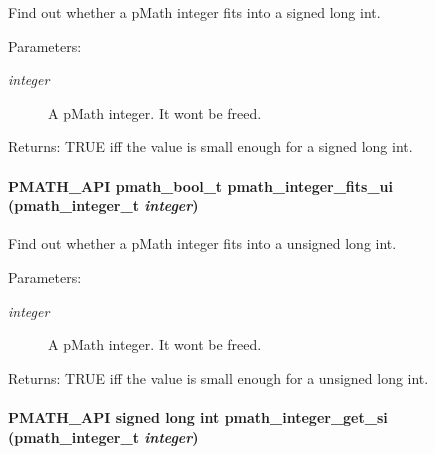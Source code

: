 Find out whether a pMath integer fits into a signed long int. 

\begin{Desc}
\item[Parameters:]
\begin{description}
\item[{\em integer}]A pMath integer. It wont be freed. \end{description}
\end{Desc}
\begin{Desc}
\item[Returns:]TRUE iff the value is small enough for a signed long int. \end{Desc}
\hypertarget{group__numbers_gb12e5e34b7918cb6beee23c57cdd0d36}{
\paragraph[{pmath\_\-integer\_\-fits\_\-ui}]{\setlength{\rightskip}{0pt plus 5cm}PMATH\_\-API {\bf pmath\_\-bool\_\-t} pmath\_\-integer\_\-fits\_\-ui ({\bf pmath\_\-integer\_\-t} {\em integer})}\hfill}
\label{group__numbers_gb12e5e34b7918cb6beee23c57cdd0d36}


Find out whether a pMath integer fits into a unsigned long int. 

\begin{Desc}
\item[Parameters:]
\begin{description}
\item[{\em integer}]A pMath integer. It wont be freed. \end{description}
\end{Desc}
\begin{Desc}
\item[Returns:]TRUE iff the value is small enough for a unsigned long int. \end{Desc}
\hypertarget{group__numbers_g12219f6f678ed0ddff66d352e0dabbd1}{
\paragraph[{pmath\_\-integer\_\-get\_\-si}]{\setlength{\rightskip}{0pt plus 5cm}PMATH\_\-API signed long int pmath\_\-integer\_\-get\_\-si ({\bf pmath\_\-integer\_\-t} {\em integer})}\hfill}
\label{group__numbers_g12219f6f678ed0ddff66d352e0dabbd1}


